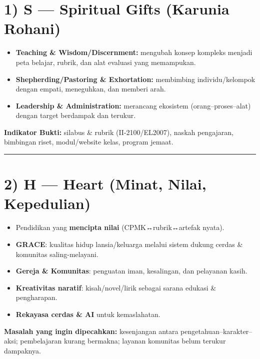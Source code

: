 \documentclass[
  letterpaper,
  DIV=11,
  numbers=noendperiod]{scrreprt}
\providecommand{\tightlist}{%
  \setlength{\itemsep}{0pt}\setlength{\parskip}{0pt}}
\begin{document}
\section{1) S --- Spiritual Gifts (Karunia
Rohani)}\label{s-spiritual-gifts-karunia-rohani}

\begin{itemize}
\tightlist
\item
  \textbf{Teaching \& Wisdom/Discernment:} mengubah konsep kompleks
  menjadi peta belajar, rubrik, dan alat evaluasi yang memampukan.
\item
  \textbf{Shepherding/Pastoring \& Exhortation:} membimbing
  individu/kelompok dengan empati, meneguhkan, dan memberi arah.
\item
  \textbf{Leadership \& Administration:} merancang ekosistem
  (orang--proses--alat) dengan target berdampak dan terukur.
\end{itemize}

\textbf{Indikator Bukti:} silabus \& rubrik (II-2100/EL2007), naskah
pengajaran, bimbingan riset, modul/website kelas, program jemaat.

\begin{center}\rule{0.5\linewidth}{0.5pt}\end{center}

\section{2) H --- Heart (Minat, Nilai,
Kepedulian)}\label{h-heart-minat-nilai-kepedulian}

\begin{itemize}
\tightlist
\item
  Pendidikan yang \textbf{mencipta nilai} (CPMK↔rubrik↔artefak nyata).
\item
  \textbf{GRACE}: kualitas hidup lansia/keluarga melalui sistem dukung
  cerdas \& komunitas saling-melayani.
\item
  \textbf{Gereja \& Komunitas}: penguatan iman, kesalingan, dan
  pelayanan kasih.
\item
  \textbf{Kreativitas naratif}: kisah/novel/lirik sebagai sarana edukasi
  \& pengharapan.
\item
  \textbf{Rekayasa cerdas \& AI} untuk kemaslahatan.
\end{itemize}

\textbf{Masalah yang ingin dipecahkan:} kesenjangan antara
pengetahuan--karakter--aksi; pembelajaran kurang bermakna; layanan
komunitas belum terukur dampaknya.
\end{document}
